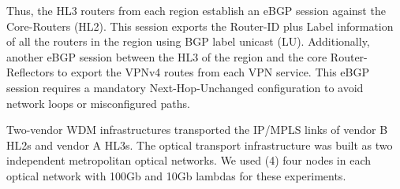 \documentclass[10pt, conference]{IEEEtran}
\begin{document}
Thus, the HL3 routers from each region establish an eBGP session against the Core-Routers (HL2). This session exports the Router-ID plus Label information of all the routers in the region using BGP label unicast (LU). Additionally, another eBGP session between the HL3 of the region and the core Router-Reflectors to export the VPNv4 routes from each VPN service. This eBGP session requires a mandatory Next-Hop-Unchanged configuration to avoid network loops or misconfigured paths. %


Two-vendor WDM infrastructures transported the IP/MPLS links of vendor B HL2s and vendor A HL3s. The optical transport infrastructure was built as two independent metropolitan optical networks. We used (4) four nodes in each optical network with 100Gb and 10Gb lambdas for these experiments. %



\end{document}
